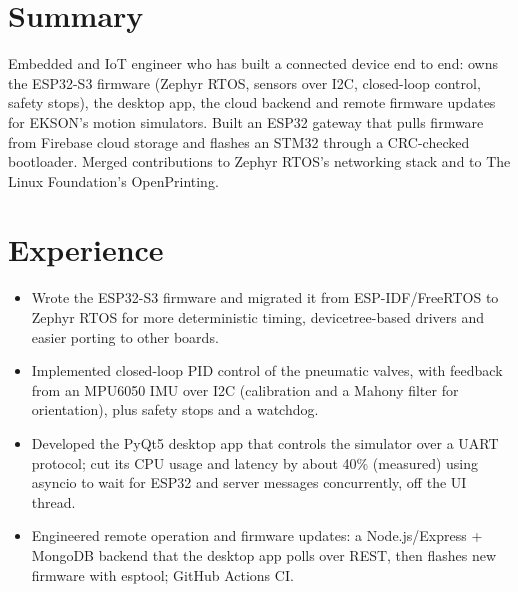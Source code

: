 \documentclass[10pt]{article}
\begin{document}

\section*{Summary}
Embedded and IoT engineer who has built a connected device end to end: owns the ESP32-S3 firmware (Zephyr RTOS, sensors over I2C, closed-loop control, safety stops), the desktop app, the cloud backend and remote firmware updates for EKSON's motion simulators. Built an ESP32 gateway that pulls firmware from Firebase cloud storage and flashes an STM32 through a CRC-checked bootloader. Merged contributions to Zephyr RTOS's networking stack and to The Linux Foundation's OpenPrinting.

\section*{Experience}
\begin{itemize}
  \item Wrote the ESP32-S3 firmware and migrated it from ESP-IDF/FreeRTOS to Zephyr RTOS for more deterministic timing, devicetree-based drivers and easier porting to other boards.
  \item Implemented closed-loop PID control of the pneumatic valves, with feedback from an MPU6050 IMU over I2C (calibration and a Mahony filter for orientation), plus safety stops and a watchdog.
  \item Developed the PyQt5 desktop app that controls the simulator over a UART protocol; cut its CPU usage and latency by about 40\% (measured) using asyncio to wait for ESP32 and server messages concurrently, off the UI thread.
  \item Engineered remote operation and firmware updates: a Node.js/Express + MongoDB backend that the desktop app polls over REST, then flashes new firmware with esptool; GitHub Actions CI.
\end{itemize}
\end{document}
